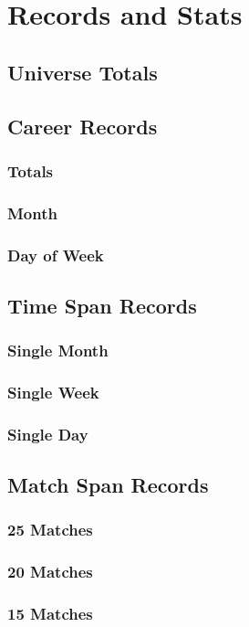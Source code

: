 \part{Records and Stats}
  \chapter{Universe Totals}
  \chapter{Career Records}
    \section{Totals}
      
    \section{Month}
      
    \section{Day of Week}
  \chapter{Time Span Records}
    \section{Single Month}
    \section{Single Week}
    \section{Single Day}
  \chapter{Match Span Records}
    \section{25 Matches}
    \section{20 Matches}
    \section{15 Matches}
